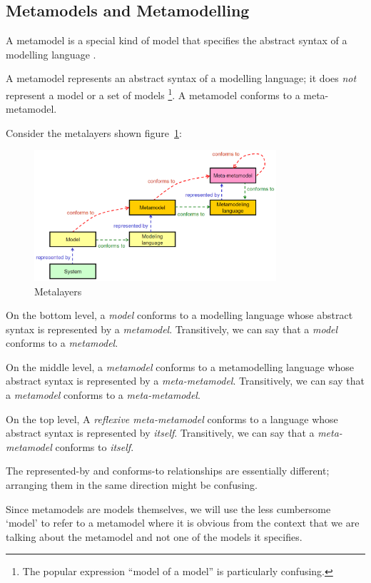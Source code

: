\subsection{Metamodels and Metamodelling}

A metamodel is a special kind of model that specifies the abstract syntax of a modelling language \cite{OMG-MDA-Foundation-Model}.

A metamodel represents an abstract syntax of a modelling language; it does \textit{not} represent a model or a set of models
\footnote{The popular expression ``model of a model'' is particularly confusing.}.
A metamodel conforms to a meta-metamodel.

Consider the metalayers shown figure~\ref{figure:metalayers}:

\begin{figure}[h]
	\centering
	\includegraphics[width=0.8\textwidth]{images/metalayers.png}
	\caption{Metalayers \cite{Genova09}}
	\label{figure:metalayers}
\end{figure}

On the bottom level, a \textit{model} conforms to a modelling language whose abstract syntax is represented by a \textit{metamodel}.
Transitively, we can say that a \textit{model} conforms to a \textit{metamodel}.

On the middle level, a \textit{metamodel} conforms to a metamodelling language whose abstract syntax is represented by a \textit{meta-metamodel}.
Transitively, we can say that a \textit{metamodel} conforms to a \textit{meta-metamodel}.

On the top level, A \textit{reflexive meta-metamodel} conforms to a language whose abstract syntax is represented by \textit{itself}.
Transitively, we can say that a \textit{meta-metamodel} conforms to \textit{itself}.

The represented-by and conforms-to relationships are essentially different; arranging them in the same direction might be confusing.

Since metamodels are models themselves, we will use the less cumbersome `model' to refer to a metamodel where it is obvious from the context that we are talking about the metamodel and not one of the models it specifies.  







